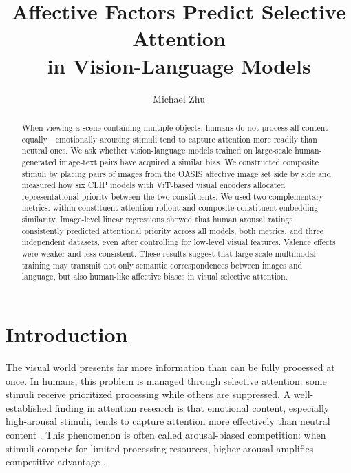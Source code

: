 \documentclass[12pt]{article}
\title{Affective Factors Predict Selective Attention\\in Vision-Language Models}
\date{}
\author[1]{Michael Zhu}
\affil[1]{Department of Psychology}
\begin{document}
\maketitle

\begin{abstract}
When viewing a scene containing multiple objects, humans do not process all content equally---emotionally arousing stimuli tend to capture attention more readily than neutral ones. We ask whether vision-language models trained on large-scale human-generated image-text pairs have acquired a similar bias. We constructed composite stimuli by placing pairs of images from the OASIS affective image set side by side and measured how six CLIP models with ViT-based visual encoders allocated representational priority between the two constituents. We used two complementary metrics: within-constituent attention rollout and composite-constituent embedding similarity. Image-level linear regressions showed that human arousal ratings consistently predicted attentional priority across all models, both metrics, and three independent datasets, even after controlling for low-level visual features. Valence effects were weaker and less consistent. These results suggest that large-scale multimodal training may transmit not only semantic correspondences between images and language, but also human-like affective biases in visual selective attention.
\end{abstract}

\section{Introduction}

The visual world presents far more information than can be fully processed at once. In humans, this problem is managed through selective attention: some stimuli receive prioritized processing while others are suppressed. A well-established finding in attention research is that emotional content, especially high-arousal stimuli, tends to capture attention more effectively than neutral content \citep{matherArousalBiasedCompetitionPerception2011, sutherlandArousalNotValence2018}. This phenomenon is often called arousal-biased competition: when stimuli compete for limited processing resources, higher arousal amplifies competitive advantage \citep{matherArousalBiasedCompetitionPerception2011}.
\end{document}
